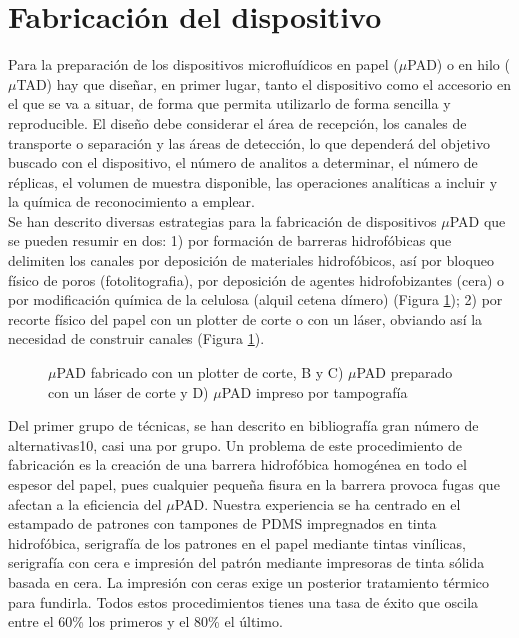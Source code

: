 \documentclass{article}
\begin{document}
\section{Fabricación del dispositivo}

Para la preparación de los dispositivos microfluídicos en papel ($\mu$PAD) o en hilo ($\mu$TAD) hay que diseñar, en primer lugar, tanto el dispositivo como el accesorio en el que se va a situar, de forma que permita utilizarlo de forma sencilla y reproducible. El diseño debe considerar el área de recepción, los canales de transporte o separación y las áreas de detección, lo que dependerá del objetivo buscado con el dispositivo, el número de analitos a determinar, el número de réplicas, el volumen de muestra disponible, las operaciones analíticas a incluir y la química de reconocimiento a emplear.\\

Se han descrito diversas estrategias para la fabricación de dispositivos $\mu$PAD que se pueden resumir en dos: 1) por formación de barreras hidrofóbicas que delimiten los canales por deposición de materiales hidrofóbicos, así por bloqueo físico de poros (fotolitografia), por deposición de agentes hidrofobizantes (cera) o por modificación química de la celulosa (alquil cetena dímero) (Figura \ref{fig:papel}); 2) por recorte físico del papel con un plotter de corte o con un láser, obviando así la necesidad de construir canales\cite{Cate2015} (Figura \ref{fig:papel}).\\


\begin{figure}[h]
\caption{ $\mu$PAD fabricado con un plotter de corte, B y C) $\mu$PAD preparado con un láser de corte y D) $\mu$PAD impreso por tampografía}
\label{fig:papel}
\end{figure}

Del primer grupo de técnicas, se han descrito en bibliografía gran número de alternativas10, casi una por grupo. Un problema de este procedimiento de fabricación es la creación de una barrera hidrofóbica homogénea en todo el espesor del papel, pues cualquier pequeña fisura en la barrera provoca fugas que afectan a la eficiencia del $\mu$PAD. Nuestra experiencia se ha centrado en el estampado de patrones con tampones de PDMS impregnados en tinta hidrofóbica, serigrafía de los patrones en el papel mediante tintas vinílicas, serigrafía con cera e impresión del patrón mediante impresoras de tinta sólida basada en cera\cite{Lopez-Ruiz2014}. La impresión con ceras exige un posterior tratamiento térmico para fundirla. Todos estos procedimientos tienes una tasa de éxito que oscila entre el 60\% los primeros y el 80\% el último.\\ 
\end{document}

